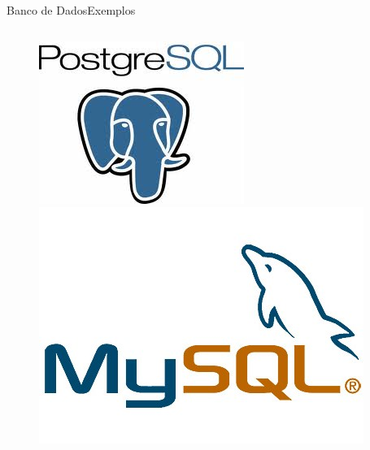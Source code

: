 \documentclass{beamer}
\begin{document}
\begin{frame}[fragile]{Banco de Dados}{Exemplos}
	\begin{columns}
		\begin{column}{0.5\textwidth}
			\begin{figure}
				\begin{minipage}{\columnwidth}
					\includegraphics[scale=0.5]{images/pg}
				\end{minipage}
				\begin{minipage}{\columnwidth}
					\includegraphics[scale=1]{images/mysql}
				\end{minipage}
			\end{figure}
		\end{column}
	

\end{columns}
\end{frame}
\end{document}
